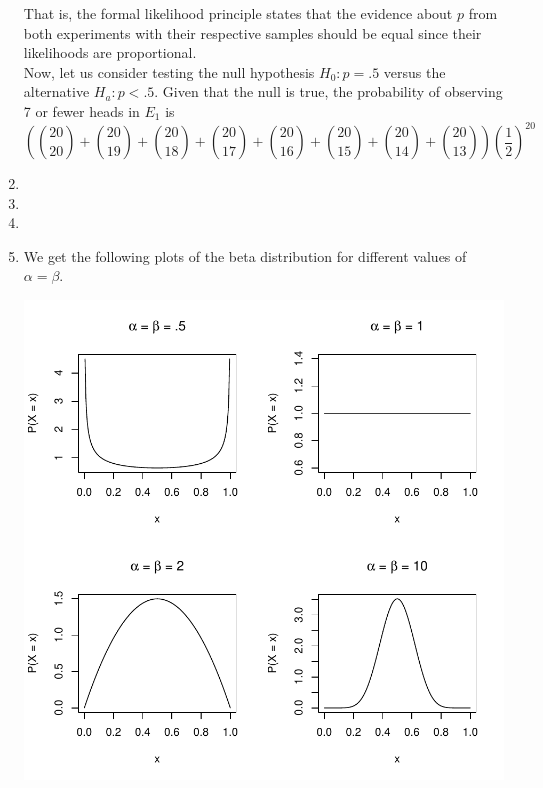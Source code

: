 \documentclass[12pt]{article}\usepackage[]{graphicx}\usepackage[]{color}
\makeatletter
\def\maxwidth{ %
  \ifdim\Gin@nat@width>\linewidth
    \linewidth
  \else
    \Gin@nat@width
  \fi
}
\newenvironment{knitrout}{}{} %
\makeatother
\begin{document}
\begin{enumerate}
That is, the formal likelihood principle states that the evidence about $p$ from both experiments with their respective samples should be equal since their likelihoods are proportional.\\

Now, let us consider testing the null hypothesis $H_0: p = .5$ versus the alternative $H_a: p < .5$. Given that the null is true, the probability of observing 7 or fewer heads in $E_1$ is 
\[ \left ( {20 \choose 20} + {20 \choose 19} +  {20 \choose 18} +  {20 \choose 17} +  {20 \choose 16} +  {20 \choose 15} +  {20 \choose 14} + {20 \choose 13} \right) \left ( \frac{1}{2} \right )^{20} \]

\item
\item
\item
\item We get the following plots of the beta distribution for different values of $\alpha = \beta$.

\begin{knitrout}
\color{fgcolor}

{\centering \includegraphics[width=\maxwidth]{figure/plot6-1} 

}



\end{knitrout}


\end{enumerate}
\end{document}
